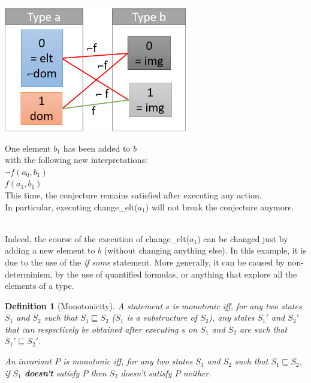 \documentclass[11pt,a4paper,oldfontcommands,openany]{memoir}
\newtheorem*{definition}{Definition}
\begin{document}
    \begin{minipage}{0.45\textwidth}
        \includegraphics[width=8cm]{NonMonotonicExValid}
    \end{minipage} \hfill
    \begin{minipage}{0.45\textwidth}
        One element \(b_1\) has been added to \(b\)\\
        with the following new interpretations:\\
        \(\neg f(a_0,b_1)\)\\
        \(f(a_1,b_1)\)\\
        This time, the conjecture remains satisfied after executing any action.\\
        In particular, executing change_elt(\(a_1\)) will not break the conjecture anymore.
    \end{minipage}\\

    Indeed, the course of the execution of change_elt(\(a_1\)) can be changed just by adding a new element to \(b\)
    (without changing anything else). In this example, it is due to the use of the \textit{if some} statement.
    More generally, it can be caused by non-determinism, by the use of quantified formulas, or anything that explore all the elements of a type.

    \begin{definition}[Monotonicity]
        A statement \(s\) is monotonic iff, for any two states \(S_1\) and \(S_2\) such that \(S_1 \sqsubseteq S_2\)
        (\(S_1\) is a substructure of \(S_2\)), any states \(S_1'\) and \(S_2'\) that can respectively be obtained after executing
        \(s\) on \(S_1\) and \(S_2\) are such that \(S_1' \sqsubseteq S_2'\).

        An invariant \(P\) is monotonic iff, for any two states \(S_1\) and \(S_2\) such that \(S_1 \sqsubseteq S_2\),
        if \(S_1\) \textbf{doesn't} satisfy \(P\) then \(S_2\) doesn't satisfy \(P\) neither.
    \end{definition}
\end{document}
